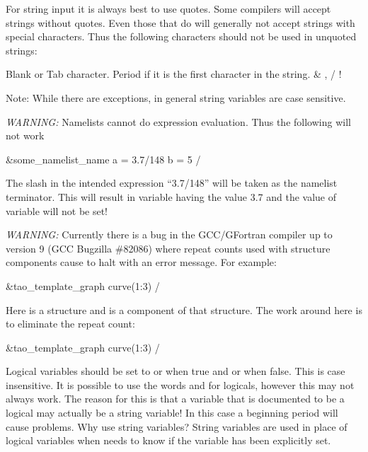 For string input it is always best to use quotes. Some compilers will accept strings without
quotes. Even those that do will generally not accept strings with special characters.  Thus the
following characters should not be used in unquoted strings:
\begin{example}
  Blank or Tab character.
  Period if it is the first character in the string.
  &   ,   /    !   %
\end{example}
Note: While there are exceptions, in general \tao string variables are
case sensitive.

{\em WARNING:} Namelists cannot do expression evaluation. Thus the following will not work
\begin{example}
  &some_namelist_name
    a = 3.7/148
    b = 5
  /
\end{example}
The slash in the intended expression ``3.7/148'' will be taken as the namelist terminator. This
will result in variable  having the value 3.7 and the value of variable  will not
be set!

{\em WARNING:} Currently there is a bug in the GCC/GFortran compiler up to version 9 (GCC Bugzilla
\#82086) where repeat counts used with structure components cause \tao to halt with an error
message. For example:
\begin{example}
  &tao_template_graph
    curve(1:3)%
  /
\end{example}
Here  is a structure and  is a component of that structure. The
work around here is to eliminate the repeat count:
\begin{example}
  &tao_template_graph
    curve(1:3)%
  /
\end{example}

Logical variables should be set to  or  when true and  or  when
false. This is case insensitive. It is possible to use the words  and  for
logicals, however this may not always work. The reason for this is that a variable that is
documented to be a logical may actually be a string variable! In this case a beginning period will
cause problems. Why use string variables? String variables are used in place of logical variables
when \tao needs to know if the variable has been explicitly set.

